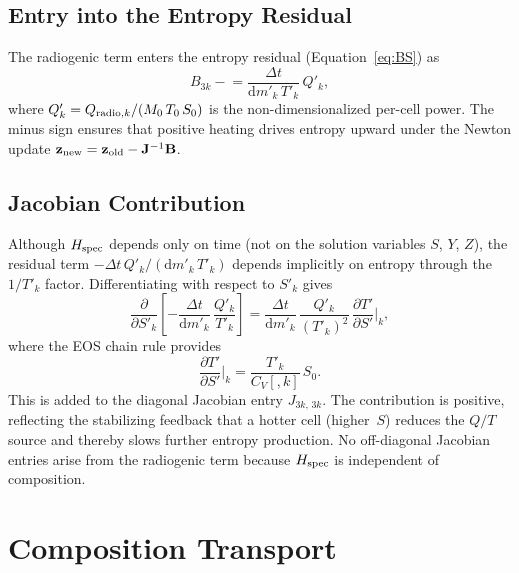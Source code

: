 \documentclass{aastex631}
\newcommand{\dd}{\mathrm{d}}
\newcommand{\pp}{\partial}
\newcommand{\Cv}{C_V}
\begin{document}
\subsection{Entry into the Entropy Residual}

The radiogenic term enters the entropy residual
(Equation~\ref{eq:BS}) as
\begin{equation}\label{eq:Bsrad}
  B_{3k} \mathrel{-}= \frac{\Delta t}{\dd m'_k\,T'_k}\,Q'_k,
\end{equation}
where $Q'_k = Q_{{\rm radio},k}/(M_0\,T_0\,S_0)$ is the
non-dimensionalized per-cell power.  The minus sign ensures that
positive heating drives entropy upward under the Newton update
$\mathbf{z}_{\rm new}=\mathbf{z}_{\rm old}-\mathbf{J}^{-1}\mathbf{B}$.

\subsection{Jacobian Contribution}

Although $H_{\rm spec}$ depends only on time (not on the solution
variables $S$, $Y$, $Z$), the residual term
$-\Delta t\,Q'_k/(\dd m'_k\,T'_k)$ depends implicitly on entropy
through the $1/T'_k$ factor.  Differentiating with respect to $S'_k$
gives
\begin{equation}\label{eq:Jrad}
  \frac{\pp}{\pp S'_k}\!\left[
    -\frac{\Delta t}{\dd m'_k}\,\frac{Q'_k}{T'_k}
  \right]
  = \frac{\Delta t}{\dd m'_k}\,
    \frac{Q'_k}{(T'_k)^{2}}\,
    \frac{\pp T'}{\pp S'}\bigg|_k,
\end{equation}
where the EOS chain rule provides
\begin{equation}\label{eq:dTdS_radio}
  \frac{\pp T'}{\pp S'}\bigg|_k
  = \frac{T'_k}{\Cv[,k]}\,S_0.
\end{equation}
This is added to the diagonal Jacobian entry $J_{3k,\,3k}$.
The contribution is positive, reflecting the stabilizing feedback
that a hotter cell (higher~$S$) reduces the $Q/T$ source and thereby
slows further entropy production.  No off-diagonal Jacobian entries
arise from the radiogenic term because $H_{\rm spec}$ is independent
of composition.

\section{Composition Transport}\label{sec:comp}
\end{document}
